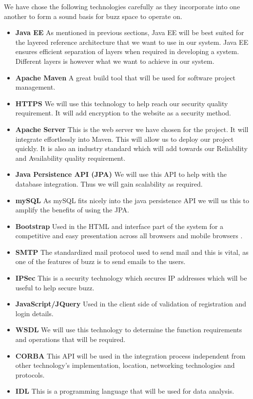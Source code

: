 We have chose the following technologies carefully as they incorporate into one another to form a sound basis for buzz space to operate on.

\begin{itemize}
	\item \textbf{Java EE}
		As mentioned in previous sections, Java EE will be best suited for the layered reference architecture that we want to use in our system. Java EE ensures efficient separation of layers when required in developing a system. Different layers is however what we want to achieve in our system.
	\item \textbf{Apache Maven}
		A great build tool that will be used for software project management.
	\item \textbf{HTTPS}
		We will use this technology to help reach our security quality requirement. It will add encryption to the website as a security method.
	\item \textbf{Apache Server}
		This is the web server we have chosen for the project. It will integrate effortlessly into Maven. This will allow us to deploy our project quickly. It is also an industry standard which will add towards our Reliability and Availability quality requirement. 
	\item \textbf{Java Persistence API (JPA) }
		We will use this API to help with the database integration. Thus we will gain scalability as required.
	\item \textbf{mySQL}
		As mySQL fits nicely into the java persistence API we will us this to amplify the benefits of using the JPA.
		
		\item \textbf{Bootstrap}
		Used in the HTML and interface part of the system for a competitive and easy presentation across all browsers 	and mobile browsers .
		\item \textbf{SMTP} The standardized mail protocol used to send mail and this is vital, as one of the features of buzz is to send emails to the users.
		\item \textbf{IPSec} This is a security technology which secures IP addresses which will be useful to help secure buzz.
	\item \textbf{JavaScript/JQuery}
		Used in the client side of validation of registration and login details.
	\item \textbf{WSDL} 
		We will use this technology to determine the function requirements and operations that will be required.
	\item \textbf{CORBA}
		This API will be used in the integration process independent from other technology's implementation, location, networking 	technologies and protocols.
	\item \textbf{IDL}
		This is a programming language that will be used for data analysis. 
		

\end{itemize}

